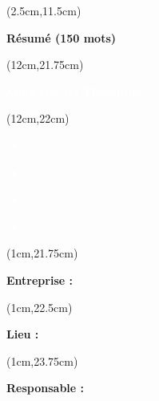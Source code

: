 \begin{titlepage}
    \begin{textblock*}{16cm}(2.5cm,11.5cm)
        \makeatletter
        \noindent
        \normalsize
        \selectfont
        \begin{center}
            \textbf{\textcolor{bleuRoiUTT}{Résumé (150 mots)}}
        \end{center}
        \begin{flushleft}
            \justifying
            \titletext
        \end{flushleft}
        \makeatother
    \end{textblock*}

    \begin{textblock*}{7.8cm}(12cm,21.75cm)
        \normalsize
        \begin{center}
            \textbf{\textcolor{white}{Mots clés (cf Thésaurus) :}}
        \end{center}
    \end{textblock*}

    \begin{textblock*}{10cm}(12cm,22cm)
        \small
        \begin{flushleft}
            \textcolor{white}{
                \begin{itemize}[label=\textcolor{white}{\textbullet}]
                    \item \textbf{\theKone}
                    \item \textbf{\theKtwo}
                    \item \textbf{\theKthree}
                    \item \textbf{\theKfourth}
                \end{itemize}
            }
        \end{flushleft}
    \end{textblock*}

    \begin{textblock*}{8cm}(1cm,21.75cm)
        \normalsize
        \begin{flushleft}
            \textbf{\textcolor{bleuRoiUTT}{Entreprise :} \theEntreprise}
        \end{flushleft}
    \end{textblock*}

    \begin{textblock*}{8cm}(1cm,22.5cm)
        \normalsize
        \begin{flushleft}
            \textbf{\textcolor{bleuRoiUTT}{Lieu :} \textit{\mapAddr{\theLieu}}}
        \end{flushleft}
    \end{textblock*}

    \begin{textblock*}{8cm}(1cm,23.75cm)
        \normalsize
        \begin{flushleft}
            \textbf{\textcolor{bleuRoiUTT}{Responsable :} \theREntre}
        \end{flushleft}
    \end{textblock*}

\end{titlepage}

\clearpage %